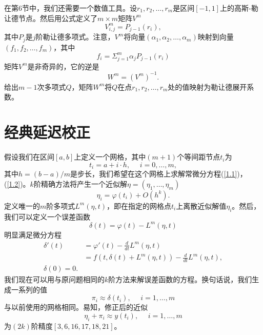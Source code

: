 \documentclass[12pt,a4paper]{article}
\begin{document}
在第$6$节中，我们还需要一个数值工具。设$r_1,r_2,\ldots,r_m$是区间$[-1,1]$上的高斯-勒让德节点。然后用公式定义了$m \times m$矩阵$V^m$\\
\begin{equation}
V_{i,j}^{m}=P_{j-1}(r_i),
\end{equation}
其中$P_j$是$j$阶勒让德多项式。注意，$V^m$将向量$(\alpha_1,\alpha_2,\ldots,\alpha_m)$映射到向量$(f_1,f_2,\ldots,f_m)$，其中\\
$$ f_i=\Sigma_{j=1}^{m} \alpha_j P_{j-1}(r_i)$$
矩阵$V^m$是非奇异的，它的逆是\\
\begin{equation}
W^m=(V^m)^{-1}.
\label{2.26}
\end{equation}
给出$m-1$次多项式$Q$，矩阵$W^m$将$Q$在点$r_1,r_2,\ldots,r_m$处的值映射为勒让德展开系数。\\
\section{经典延迟校正}

假设我们在区间$[a,b]$上定义一个网格，其中$(m+1)$个等间距节点$t_i$为\\
\begin{equation}
t_i=a+i \cdot h,~~~~~~i=0,\ldots,m,
\end{equation}
其中$h=(b-a)/m$是步长，我们希望在这个网格上求解常微分方程(\ref{1.1})，(\ref{1.2})。$k$阶精确方法将产生一个近似解$\eta=(\eta_1,\ldots,\eta_m)$\\
\begin{equation}
\eta_i= \varphi(t_i)+O(h^k).
\end{equation}
定义唯一的$m$阶多项式$L^m(\eta,t)$，即在指定的网格点$t_i$上离散近似解值$\eta_i$。然后，我们可以定义一个误差函数\\
\begin{equation}
\delta(t)= \varphi(t)-L^m(\eta,t)
\end{equation}
明显满足微分方程\\
\begin{equation}
\begin{aligned}
\delta'(t)&=\varphi'(t)-\frac{d}{dt}L^m(\eta,t)\\&=f(t,\delta(t)+L^m(\eta,t))-\frac{d}{dt}L^m(\eta,t),\\
\delta(0)=0.
\end{aligned}
\label{3.4}
\end{equation}
我们现在可以用与原问题相同的$k$阶方法来解误差函数的方程。换句话说，我们生成一系列的值\\
\begin{equation}
\pi_i\approx \delta(t_i),~~~~~~i=1,\ldots,m
\end{equation}
与以前使用的网格相同。易知，修正后的近似\\
\begin{equation}
\eta_i+\pi_i \approx y(t_i),~~~~~~i=1,\ldots,m
\end{equation}
为$(2k)$阶精度$[3,6,16,17,18,21]$。\\
\end{document}
